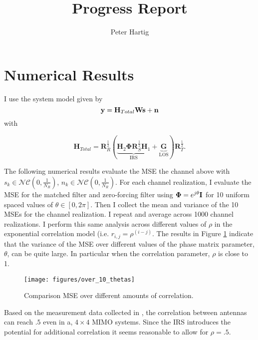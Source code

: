 \documentclass[12pt,a4paper]{report}
\title{Progress Report}
\author{Peter Hartig}
\begin{document}
\maketitle
\tableofcontents

\section{Numerical Results}
I use the system model given by 
\begin{equation}
\mathbf{y} = \mathbf{H}_{Total} \mathbf{W} \mathbf{s}  + \mathbf{n}
\end{equation}
with 

	\begin{equation}
	\mathbf{H}_{Total} = \mathbf{R}_{R}^{\frac{1}{2}}(\underbrace{\mathbf{H}_{2}\boldsymbol{\Phi}\mathbf{R}_{S}^{\frac{1}{2}}\mathbf{H}_{1}}_{\text{IRS}} + \underbrace{\mathbf{G}}_{\text{LOS}})\mathbf{R}_{T}^{\frac{1}{2}}.
	\end{equation}

The following numerical results evaluate the MSE the channel above with $s_k \in \mathcal{NC}(0,\frac{1}{N_R})$, $n_k \in \mathcal{NC}(0,\frac{1}{N_R})$.
For each channel realization, I evaluate the MSE for the matched filter and zero-forcing filter using $\boldsymbol{\Phi} = e^{j\theta}\mathbf{I}$ for 10 uniform spaced values of $\theta \in [0, 2\pi]$. Then I collect the mean and variance of the 10 MSEs for the channel realization. I repeat and average across 1000 channel realizations. I perform this same analysis across different values of $\rho$ in the exponential correlation model (i.e.  $r_{i,j}=\rho^(i-j)$. The results in Figure \ref{MSE_correlation} indicate that the variance of the MSE over different values of the phase matrix parameter, $\theta$,  can be quite large. In particular when the correlation parameter, $\rho$ is close to 1.
		\begin{figure}[H]
	\texttt{[image: figures/over\_10\_thetas]}
	  \caption{Comparison MSE over different amounts of correlation.}
	  	  \label{MSE_correlation}
	\end{figure}

Based on the measurement data collected in \cite{martin2000multiple}, the correlation between antennas can reach $.5$ even in a, $4 \times 4 $ MIMO systems. 
Since the IRS introduces the potential for additional correlation it seems reasonable to allow for $\rho = .5$.
\end{document}
